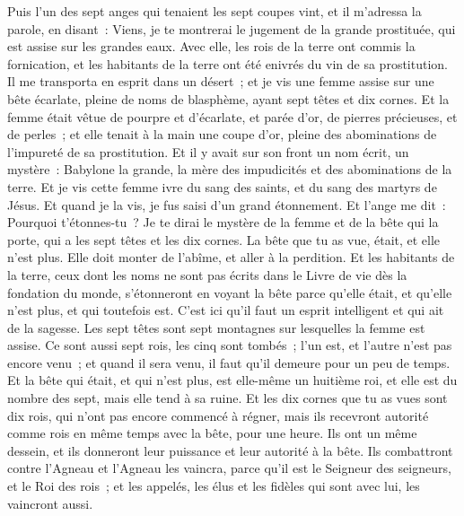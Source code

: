 \begin{multicols}{2}
\VerseOne{}Puis l'un des sept anges qui tenaient les sept coupes vint, et il m'adressa la parole, en disant~: Viens, je te montrerai le jugement de la grande prostituée, qui est assise sur les grandes eaux.
Avec elle, les rois de la terre ont commis la fornication, et les habitants de la terre ont été enivrés du vin de sa prostitution.
Il me transporta en esprit dans un désert~; et je vis une femme assise sur une bête écarlate, pleine de noms de blasphème, ayant sept têtes et dix cornes.
Et la femme était vêtue de pourpre et d'écarlate, et parée d'or, de pierres précieuses, et de perles~; et elle tenait à la main une coupe d'or, pleine des abominations de l'impureté de sa prostitution.
Et il y avait sur son front un nom écrit, un mystère~: Babylone la grande, la mère des impudicités et des abominations de la terre.
Et je vis cette femme ivre du sang des saints, et du sang des martyrs de Jésus. Et quand je la vis, je fus saisi d'un grand étonnement.
Et l'ange me dit~: Pourquoi t'étonnes-tu~? Je te dirai le mystère de la femme et de la bête qui la porte, qui a les sept têtes et les dix cornes.
La bête que tu as vue, était, et elle n'est plus. Elle doit monter de l'abîme, et aller à la perdition. Et les habitants de la terre, ceux dont les noms ne sont pas écrits dans le Livre de vie dès la fondation du monde, s'étonneront en voyant la bête parce qu'elle était, et qu'elle n'est plus, et qui toutefois est.
C'est ici qu'il faut un esprit intelligent et qui ait de la sagesse. Les sept têtes sont sept montagnes sur lesquelles la femme est assise.
Ce sont aussi sept rois, les cinq sont tombés~; l'un est, et l'autre n'est pas encore venu~; et quand il sera venu, il faut qu'il demeure pour un peu de temps.
Et la bête qui était, et qui n'est plus, est elle-même un huitième roi, et elle est du nombre des sept, mais elle tend à sa ruine.
Et les dix cornes que tu as vues sont dix rois, qui n'ont pas encore commencé à régner, mais ils recevront autorité comme rois en même temps avec la bête, pour une heure.
Ils ont un même dessein, et ils donneront leur puissance et leur autorité à la bête.
Ils combattront contre l'Agneau et l'Agneau les vaincra, parce qu'il est le Seigneur des seigneurs, et le Roi des rois~; et les appelés, les élus et les fidèles qui sont avec lui, les vaincront aussi.

\end{multicols}
